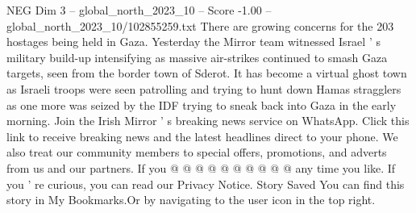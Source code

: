 \begin{textsample}{NEG Dim 3 – global\_north\_2023\_10 – Score -1.00 – global\_north\_2023\_10/102855259.txt}
There are growing concerns for the 203 hostages being held in Gaza.
Yesterday the Mirror team witnessed Israel ' s military build-up intensifying as massive air-strikes continued to smash Gaza targets, seen from the border town of Sderot.
It has become a virtual ghost town as Israeli troops were seen patrolling and trying to hunt down Hamas stragglers as one more was seized by the IDF trying to sneak back into Gaza in the early morning.
Join the Irish Mirror ' s breaking news service on WhatsApp.
Click this link to receive breaking news and the latest headlines direct to your phone.
We also treat our community members to special offers, promotions, and adverts from us and our partners.
If you @ @ @ @ @ @ @ @ @ @ any time you like.
If you ' re curious, you can read our Privacy Notice.
Story Saved You can find this story in My Bookmarks.Or by navigating to the user icon in the top right.

\end{textsample}
